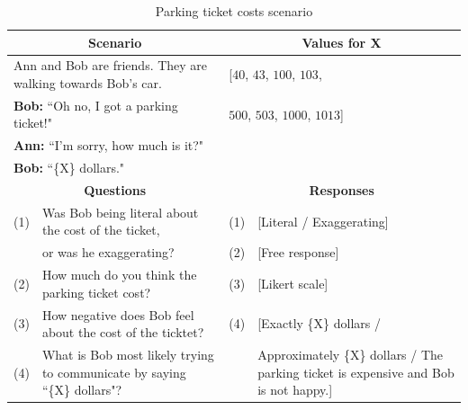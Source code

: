 \documentclass{article} %
\begin{document}
\begin{table}[h]
\begin{tabular}{| p{0.15cm}  p{8.15cm}| p{0.15cm}p{4cm} |}\hline
\multicolumn{2}{|c|}{\textbf{Scenario}} & \multicolumn{2}{c|}{\textbf{Values for X}} \\\hline
\multicolumn{2}{|l|}{Ann and Bob are friends. They are walking towards Bob's car.} & \multicolumn{2}{l|}{[$40$, $43$, $100$, $103$,}\\
\multicolumn{2}{|l|}{\textbf{Bob:} ``Oh no, I got a parking ticket!"} &
\multicolumn{2}{l|}{$500$, $503$, $1000$, $1013$]}\\
\multicolumn{2}{|l|}{\textbf{Ann:} ``I'm sorry, how much is it?"} & \multicolumn{2}{l|}{}\\
\multicolumn{2}{|l|}{\textbf{Bob:} ``\{X\} dollars."} & \multicolumn{2}{l|}{}\\\hline
\multicolumn{2}{|c|}{\textbf{Questions}} & \multicolumn{2}{c|}{\textbf{Responses}} \\\hline
(1) & Was Bob being literal about the cost of the ticket, & (1) &[Literal / Exaggerating] \\
 & or was he exaggerating? & (2) & [Free response] \\
(2) & How much do you think the parking ticket cost? & (3) & [Likert scale] \\
(3) & How negative does Bob feel about the cost of the ticktet? & (4) & [Exactly \{X\} dollars / \\
(4) & What is Bob most likely trying to communicate by saying  ``\{X\} dollars"? & & Approximately \{X\} dollars / The parking ticket is expensive and Bob is not happy.]\\\hline
\end{tabular}
\caption{Parking ticket costs scenario}
\label{tab:parkingtable}
\end{table}
\end{document}
